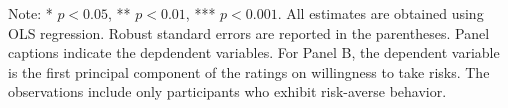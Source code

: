 \documentclass[12pt]{article}
\begin{document}
\begin{table}
    \vspace*{4pt}
    \centering
    \begin{minipage}{0.85\textwidth}
    {\par\footnotesize Note: * $p<0.05$, ** $p<0.01$, *** $p<0.001$. All estimates are obtained using OLS regression. Robust standard errors are reported in the parentheses. Panel captions indicate the depdendent variables. For Panel B, the dependent variable is the first principal component of the ratings on willingness to take risks. The observations include only participants who exhibit risk-averse behavior. }
    \end{minipage}
    \label{tab:psm_risk_encode}
\end{table}
\end{document}
